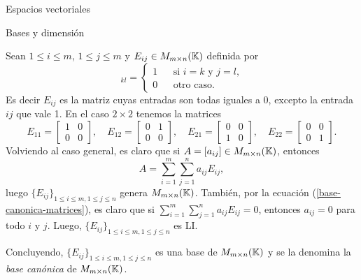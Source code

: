 \begin{chapter}{Espacios vectoriales}
\begin{section}{Bases y dimensi\'on}
\begin{ejemplo*} 
    Sean $1 \le i \le m$, $1\le j \le m$ y $E_{ij} \in M_{m \times n}(\mathbb K)$ definida por
    \begin{equation*}
        [E_{ij}]_{kl} = \left\{ 
        \begin{array}{lll}
        1& &\text{si $i=k$ y $j=l$,} \\
        0& &\text{otro caso}. 
        \end{array}
         \right.
    \end{equation*}
    Es decir $E_{ij}$  es la matriz cuyas entradas son todas iguales a 0,  excepto la entrada $ij$ que vale 1. En el caso $2 \times 2$  tenemos la matrices
    \begin{equation*}
        E_{11} = \begin{bmatrix} 1&0\\0&0\end{bmatrix}, \quad
        E_{12} = \begin{bmatrix} 0&1\\0&0\end{bmatrix}, \quad
        E_{21} = \begin{bmatrix} 0&0\\1&0\end{bmatrix}, \quad
        E_{22} = \begin{bmatrix} 0&0\\0&1\end{bmatrix}.
    \end{equation*}
    Volviendo al caso general,  es claro que si $A= [a_{ij}] \in M_{m \times n}(\mathbb K)$,  entonces
    \begin{equation}\label{base-canonica-matrices}
        A = \sum_{i=1}^{m} \sum_{j=1}^{n} a_{ij}E_{ij},
    \end{equation}
    luego $\{E_{ij} \}_{1 \le i \le m, 1\le j \le n}$ genera $M_{m \times n}(\mathbb K)$. También, por la ecuación (\ref{base-canonica-matrices}), es claro que si $\sum_{i=1}^{m} \sum_{j=1}^{n} a_{ij}E_{ij}=0$,  entonces $a_{ij}=0$ para todo $i$ y $j$. Luego,  $\{E_{ij} \}_{1 \le i \le m, 1\le j \le n}$ es LI. 
    
    Concluyendo,  $\{E_{ij} \}_{1 \le i \le m, 1\le j \le n}$ es una base de  $M_{m \times n}(\mathbb K)$ y se la denomina la \textit{base canónica} de  $M_{m \times n}(\mathbb K)$.
\end{ejemplo*}


\end{section}
\end{chapter}
